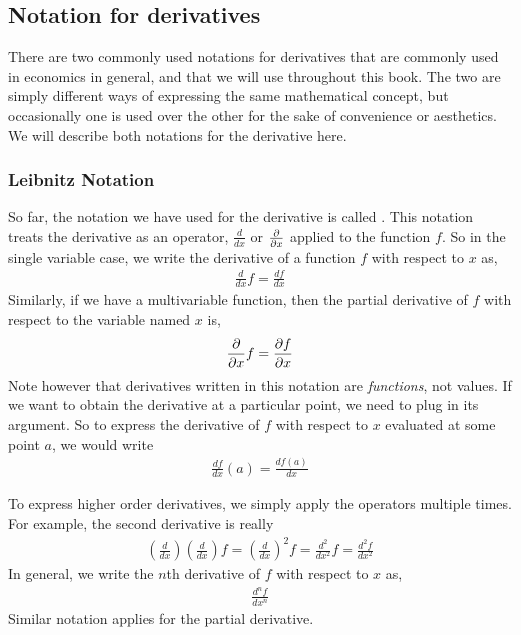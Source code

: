 \subsection*{Notation for derivatives}
There are two commonly used notations for derivatives that are commonly used in economics in general, and that we will use throughout this book. The two are simply different ways of expressing the same mathematical concept, but occasionally one is used over the other for the sake of convenience or aesthetics. We will describe both notations for the derivative here.

\subsubsection*{Leibnitz Notation}
So far, the notation we have used for the derivative is called . This notation treats the derivative as an operator, $\frac{d}{dx}$ or $\frac{\partial }{\partial x}$ applied to the function $f$. So in the single variable case, we write the derivative of a function $f$ with respect to $x$ as,
\begin{align*}
    \frac{d}{dx} f = \frac{df}{dx}
\end{align*}
Similarly, if we have a multivariable function, then the partial derivative of $f$ with respect to the variable named $x$ is,
\begin{align*}
    \frac{\partial }{\partial x} f = \frac{\partial f}{\partial x}
\end{align*}
Note however that derivatives written in this notation are \emph{functions}, not values. If we want to obtain the derivative at a particular point, we need to plug in its argument. So to express the derivative of $f$ with respect to $x$ evaluated at some point $a$, we would write
\begin{align*}
    \frac{df}{dx}(a) = \frac{df(a)}{dx}
\end{align*}

To express higher order derivatives, we simply apply the operators multiple times. For example, the second derivative is really
\begin{align*}
    \left(\frac{d}{dx}\right)\left(\frac{d}{dx}\right) f = \left(\frac{d}{dx}\right)^2 f = \frac{d^2}{dx^2}f = \frac{d^2 f}{dx^2}
\end{align*}
In general, we write the $n$th derivative of $f$ with respect to $x$ as,
\begin{align*}
    \frac{d^n f}{dx^n}
\end{align*}
Similar notation applies for the partial derivative.

